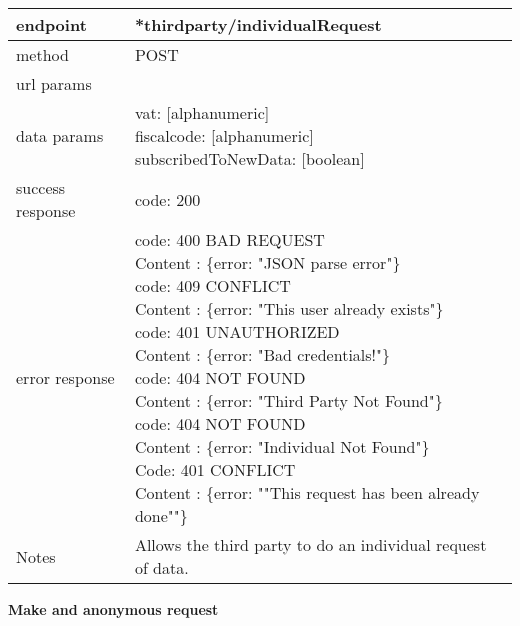 \begin{tabularx}{\linewidth}{| l| l }
	\hline
	endpoint & *thirdparty/individualRequest \\
	\hline
	method & POST \\
	\hline
	url params & \\
	\hline
	data params &
	\parbox{0.7\textwidth}{
		\bigskip
		vat: [alphanumeric]\\
		fiscalcode: [alphanumeric]\\
		subscribedToNewData: [boolean]
		\bigskip
	} \\
	\hline
	success response &
	\parbox{0.7\textwidth}{
		\bigskip
		code: 200
		\bigskip
	} \\
	\hline
	error response &
	\parbox{0.7\textwidth}{
		\bigskip
		code: 400 BAD REQUEST \\
		Content : \{error: "JSON parse error"\}\\
		code: 409 CONFLICT \\
		Content : \{error: "This user already exists"\}\\
		code: 401 UNAUTHORIZED \\
		Content : \{error: "Bad credentials!"\}\\
		code: 404 NOT FOUND \\
		Content : \{error: "Third Party Not Found"\}\\
		code: 404 NOT FOUND \\
		Content : \{error: "Individual Not Found"\}\\
		Code: 401 CONFLICT \\
		Content : \{error: ""This request has been already done""\}\\
		\bigskip
	} \\
	\hline
	Notes & 
	\parbox{0.7\textwidth}{
		\bigskip Allows the third party to do an individual request of data.
	\bigskip}  \\
	\hline
\end{tabularx}
\newpage
\textbf{Make and anonymous request} \\

